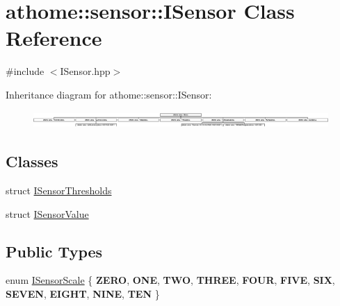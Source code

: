\hypertarget{classathome_1_1sensor_1_1_i_sensor}{}\section{athome\+:\+:sensor\+:\+:I\+Sensor Class Reference}
\label{classathome_1_1sensor_1_1_i_sensor}


{\ttfamily \#include $<$I\+Sensor.\+hpp$>$}

Inheritance diagram for athome\+:\+:sensor\+:\+:I\+Sensor\+:\begin{figure}[H]
\begin{center}
\leavevmode
\includegraphics[height=0.629921cm]{classathome_1_1sensor_1_1_i_sensor}
\end{center}
\end{figure}
\subsection*{Classes}
\begin{DoxyCompactItemize}
\item 
struct \mbox{\hyperlink{structathome_1_1sensor_1_1_i_sensor_1_1_i_sensor_thresholds}{I\+Sensor\+Thresholds}}
\item 
struct \mbox{\hyperlink{structathome_1_1sensor_1_1_i_sensor_1_1_i_sensor_value}{I\+Sensor\+Value}}
\end{DoxyCompactItemize}
\subsection*{Public Types}
\begin{DoxyCompactItemize}
\item 
enum \mbox{\hyperlink{classathome_1_1sensor_1_1_i_sensor_aa70bc27a4c17c86caf96cca776541ddf}{I\+Sensor\+Scale}} \{ \newline
{\bfseries Z\+E\+RO}, 
{\bfseries O\+NE}, 
{\bfseries T\+WO}, 
{\bfseries T\+H\+R\+EE}, 
\newline
{\bfseries F\+O\+UR}, 
{\bfseries F\+I\+VE}, 
{\bfseries S\+IX}, 
{\bfseries S\+E\+V\+EN}, 
\newline
{\bfseries E\+I\+G\+HT}, 
{\bfseries N\+I\+NE}, 
{\bfseries T\+EN}
 \}
\end{DoxyCompactItemize}
